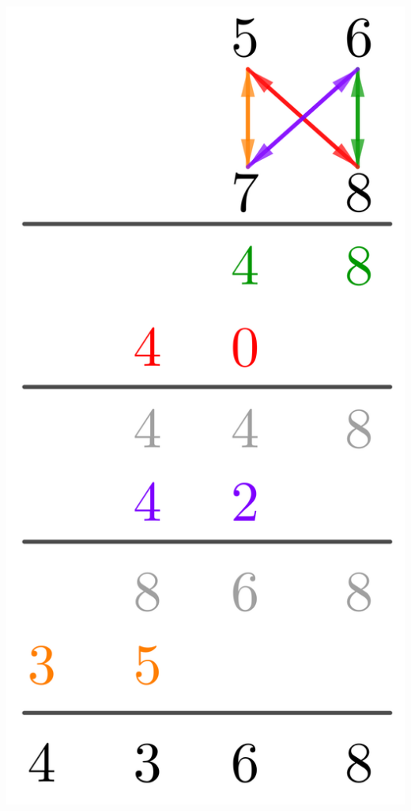 \begin{center}
	\includegraphics[scale=.75]{not-so-basic-arithmetic-ope/product-two-digits-easier.png}
\end{center}